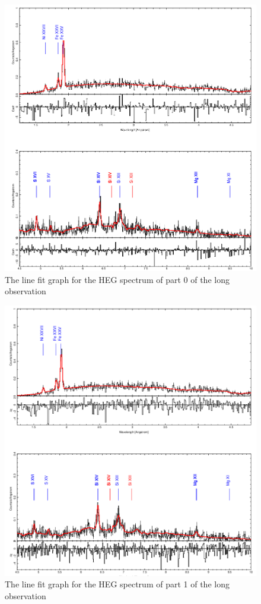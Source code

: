 \begin{figure}[h!]
    \centering
    \includegraphics[width=\linewidth]{Chapters/Figures/part0_heg.png}
    \caption{The line fit graph for the HEG spectrum of part 0 of the long observation}
    \label{fig:part0}
\end{figure}

\begin{figure}[h!]
    \centering
    \includegraphics[width=\linewidth]{Chapters/Figures/part1_heg.png}
    \caption{The line fit graph for the HEG spectrum of part 1 of the long observation}
    \label{fig:part1}
\end{figure}


